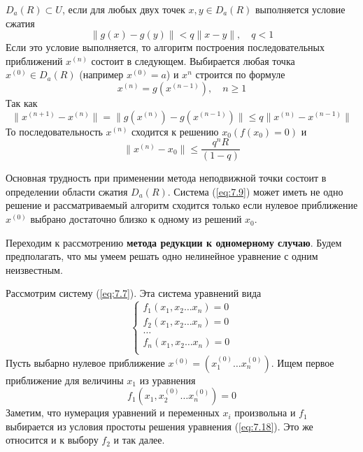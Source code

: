 $D_a(R) \subset U$, если для любых двух точек $x, y \in D_a(R)$ выполняется условие сжатия
\begin{equation} \label{eq:7.13}
	\|g(x) - g(y)\| < q\|x - y\|, \quad q < 1
\end{equation}
Если это условие выполняется, то алгоритм построения последовательных приближений $x^{(n)}$ состоит в следующем. Выбирается любая точка $x^{(0)} \in D_a(R)$ (например $x^{(0)} = a$) и $x^{{n}}$ строится по формуле
\begin{equation} \label{eq:7.14}
	x^{(n)} = g(x^{(n-1)}), \quad n \geq 1
\end{equation}
Так как
\begin{equation} \label{eq:7.15}
	\|x^{(n+1)} - x^{(n)}\| = \|g(x^{(n)}) - g(x^{(n-1)})\| \leq q\|x^{(n)} - x^{(n-1)}\|
\end{equation}
То последовательность $x^{(n)}$ сходится к решению $x_0 (f(x_0) = 0)$ и 
\begin{equation} \label{eq:7.16}
	\|x^{(n)} - x_0\| \leq \frac{q^nR}{(1-q)}
\end{equation}


Основная трудность при применении метода неподвижной точки состоит в определении области сжатия $D_a(R)$. Система (\ref{eq:7.9}) может иметь не одно решение и рассматриваемый алгоритм сходится только если нулевое приближение $x^{(0)}$ выбрано достаточно близко к одному из решений $x_0$.

Переходим к рассмотрению \textbf{метода редукции к одномерному случаю}. Будем предполагать, что мы умеем решать одно нелинейное уравнение с одним неизвестным.

Рассмотрим систему (\ref{eq:7.7}). Эта система уравнений вида
\begin{equation} \label{eq:7.17}
	\begin{cases} 
		f_1(x_1, x_2 \dots x_n) = 0 \\
		f_2(x_1, x_2 \dots x_n) = 0 \\
		\dots \\
		f_n(x_1, x_2 \dots x_n) = 0 \\
	\end{cases}
\end{equation}
Пусть выбарно нулевое приближение $x^{(0)} = (x_1^{(0)} \dots x_n^{(0)})$. Ищем первое приближение для величины $x_1$ из уравнения
\begin{equation} \label{eq:7.18}
	f_1(x_1, x_2^{(0)} \dots x_n^{(0)}) = 0
\end{equation}
Заметим, что нумерация уравнений и переменных $x_i$ произвольна и $f_1$ выбирается из условия простоты решения уравнения (\ref{eq:7.18}). Это же относится и к выбору $f_2$ и так далее.


